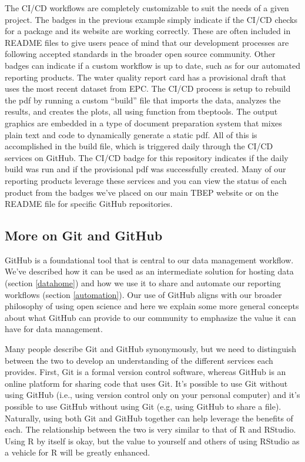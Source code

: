 \documentclass[
]{book}
\begin{document}
The CI/CD workflows are completely customizable to suit the needs of a given project. The badges in the previous example simply indicate if the CI/CD checks for a package and its website are working correctly. These are often included in README files to give users peace of mind that our development processes are following accepted standards in the broader open source community. Other badges can indicate if a custom workflow is up to date, such as for our automated reporting products. The water quality report card has a provisional draft that uses the most recent dataset from EPC. The CI/CD process is setup to rebuild the pdf by running a custom ``build'' file that imports the data, analyzes the results, and creates the plots, all using function from tbeptools. The output graphics are embedded in a type of document preparation system that mixes plain text and code to dynamically generate a static pdf. All of this is accomplished in the build file, which is triggered daily through the CI/CD services on GitHub. The CI/CD badge for this repository indicates if the daily build was run and if the provisional pdf was successfully created. Many of our reporting products leverage these services and you can view the status of each product from the badges we've placed on our main TBEP website or on the README file for specific GitHub repositories.

\subsection{More on Git and GitHub}\label{moregit}

GitHub is a foundational tool that is central to our data management workflow. We've described how it can be used as an intermediate solution for hosting data (section \ref{datahome}) and how we use it to share and automate our reporting workflows (section \ref{automation}). Our use of GitHub aligns with our broader philosophy of using open science and here we explain some more general concepts about what GitHub can provide to our community to emphasize the value it can have for data management.

Many people describe Git and GitHub synonymously, but we need to distinguish between the two to develop an understanding of the different services each provides. First, Git is a formal version control software, whereas GitHub is an online platform for sharing code that uses Git. It's possible to use Git without using GitHub (i.e., using version control only on your personal computer) and it's possible to use GitHub without using Git (e.g, using GitHub to share a file). Naturally, using both Git and GitHub together can help leverage the benefits of each. The relationship between the two is very similar to that of R and RStudio. Using R by itself is okay, but the value to yourself and others of using RStudio as a vehicle for R will be greatly enhanced.
\end{document}
